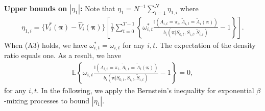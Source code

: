 \documentclass{article}
\newcommand{\Mean}{{\mathbb{E}}}
\begin{document}
\textbf{Upper bounds on $|\eta_1|$: }Note that $\eta_1=N^{-1}\sum_{i=1}^N \eta_{1,i}$ where
\begin{eqnarray*}
	\eta_{1,i}=\{V_i^*(\bm{\pi})- \widehat{V}_i(\bm{\pi}) \}\left[\frac{1}{T}\sum_{t=0}^{T-1} \left\{\omega_{i,t}^*\frac{\mathbb{I}(A_{i,t}=\pi_i,\widetilde{A}_{i,t}=\widetilde{A}_i(\bm{\pi}))}{b_i(\bm{\pi}|S_{0,t},S_{i,t},\widetilde{S}_{i,t})}-1\right\}\right].
\end{eqnarray*}
When (A3) holds, we have $\omega_{i,t}^*=\omega_{i,t}$ for any $i,t$. The expectation of the density ratio equals one. As a result, we have
\begin{eqnarray*}
	\Mean \left\{\omega_{i,t}\frac{\mathbb{I}(A_{i,t}=\pi_i,\widetilde{A}_{i,t}=\widetilde{A}_i(\bm{\pi}))}{b_i(\bm{\pi}|S_{0,t},S_{i,t},\widetilde{S}_{i,t})}-1\right\}=0,
\end{eqnarray*}
for any $i,t$. In the following, we apply the Bernstein's inequality for exponential $\beta$-mixing processes \cite{Chen2015} to bound $|\eta_1|$. 
\end{document}
